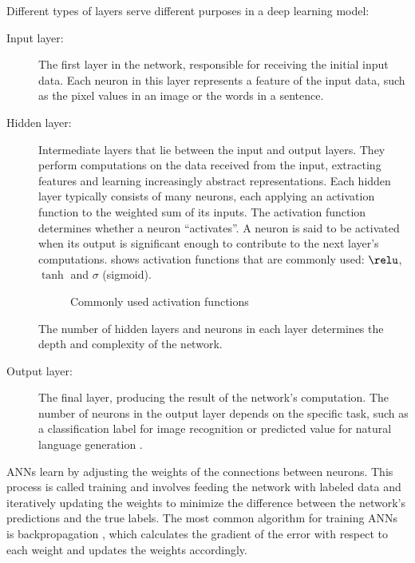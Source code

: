 Different types of layers serve different purposes in a deep learning model:
\begin{description}
    \item[Input layer:] 
    The first layer in the network, responsible for receiving the initial input data.
    Each neuron in this layer represents a feature of the input data, such as the pixel values in an image or the words in a sentence.
    \item[Hidden layer:] 
    Intermediate layers that lie between the input and output layers.
    They perform computations on the data received from the input, extracting features and learning increasingly abstract representations.
    Each hidden layer typically consists of many neurons, each applying an activation function to the weighted sum of its inputs.
    The activation function determines whether a neuron ``activates''.
    A neuron is said to be activated when its output is significant enough to contribute to the next layer's computations.
     shows activation functions that are commonly used: $\relu$, $\tanh$ and $\sigma$ (sigmoid).

    \begin{figure}[hbtp]
        \centering    
        
        \caption{Commonly used activation functions}
        \label{fig:activation_functions}
    \end{figure} 

    The number of hidden layers and neurons in each layer determines the depth and complexity of the network.
    \item[Output layer:] 
    The final layer, producing the result of the network's computation.
    The number of neurons in the output layer depends on the specific task, such as a classification label for image recognition or predicted value for natural language generation \cite{goodfellowDeepLearning2016}.
\end{description}

ANNs learn by adjusting the weights of the connections between neurons.
This process is called training and involves feeding the network with labeled data and iteratively updating the weights to minimize the difference between the network's predictions and the true labels.
The most common algorithm for training ANNs is backpropagation \cite{rumelhartLearningRepresentationsBackpropagating1986}, which calculates the gradient of the error with respect to each weight and updates the weights accordingly.

